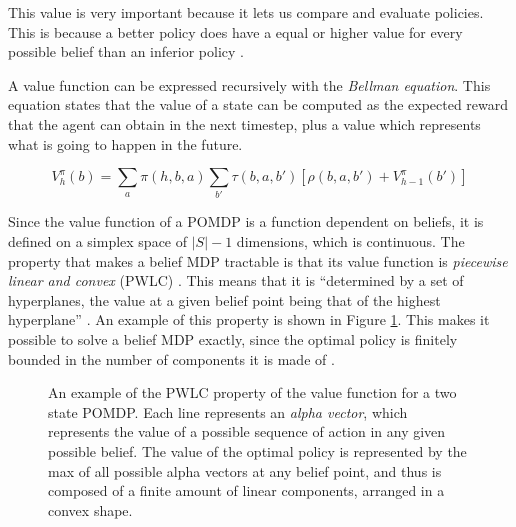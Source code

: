 This value is very important because it lets us compare and evaluate policies. This is because a
better policy does have a equal or higher value for every possible belief than an inferior policy
\cite{cit:suttonbarto}.

A value function can be expressed recursively with the \textit{Bellman equation}. This equation
states that the value of a state can be computed as the expected reward that the agent can obtain in
the next timestep, plus a value which represents what is going to happen in the future.

\begin{equation}
 V^{\pi}_{h}(b) = \sum_a \pi(h, b, a) \sum_{b'} \tau(b, a, b') \left [ \rho(b, a, b') +
V^{\pi}_{h-1}(b') \right ]
\end{equation}

Since the value function of a POMDP is a function dependent on beliefs, it is defined on a simplex
space of $|S|-1$ dimensions, which is continuous. The property that makes a belief MDP tractable is
that its value function is \textit{piecewise linear and convex} (PWLC) \cite{pomdp}. This means that it is
``determined by a set of hyperplanes, the value at a given belief point being that of the highest
hyperplane'' \cite{cit:rpomdp}. An example of this property is shown in Figure \ref{pwlcpic}. This
makes it possible to solve a belief MDP exactly, since the optimal policy is finitely bounded in the
number of components it is made of \cite{cit:pomdp}.

\begin{figure}[ht]
\begin{center}
\end{center}
\caption{An example of the PWLC property of the value function for a two state POMDP. Each line
represents an \textit{alpha vector}, which represents the value of a possible sequence of action in
any given possible belief. The value of the optimal policy is represented by the max of all possible
alpha vectors at any belief point, and thus is composed of a finite amount of linear components,
arranged in a convex shape.}
\label{pwlcpic}
\end{figure}

